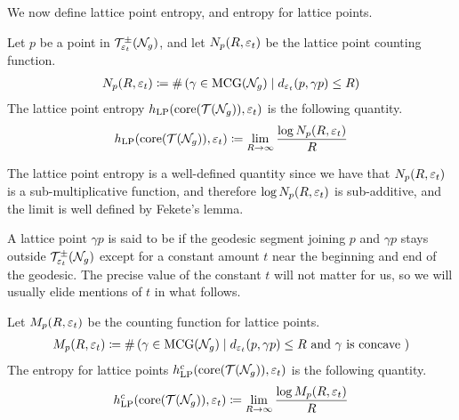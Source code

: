 We now define lattice point entropy, and entropy for \concave lattice points.
\begin{definition}
  Let $p$ be a point in $\mathcal{T}_{\varepsilon_t}^{\pm}(\mathcal{N}_g)$, and let $N_p(R, \varepsilon_t)$ be the lattice point counting function.
  \begin{align*}
    N_p(R, \varepsilon_t) \coloneqq \#\left( \gamma \in \mathrm{MCG}(\mathcal{N}_g) \mid d_{\varepsilon_t}(p, \gamma p) \leq R \right)
  \end{align*}
  The lattice point entropy $h_{\mathrm{LP}}(\mathrm{core}(\mathcal{T}(\mathcal{N}_g)), \varepsilon_t)$ is the following quantity.
  \begin{align*}
    h_{\mathrm{LP}}(\mathrm{core}(\mathcal{T}(\mathcal{N}_g)), \varepsilon_t) \coloneqq \lim_{R \to \infty} \frac{\log N_p(R, \varepsilon_t)}{R}
  \end{align*}
\end{definition}

\begin{rem}
  The lattice point entropy is a well-defined quantity since we have that $N_p(R, \varepsilon_t)$ is a sub-multiplicative function, and therefore $\log N_p(R, \varepsilon_t)$ is sub-additive, and the limit is well defined by Fekete's lemma.
\end{rem}

\begin{definition}
  A lattice point $\gamma p$ is said to be \concave if the geodesic segment joining $p$ and $\gamma p$ stays outside $\mathcal{T}_{\varepsilon_t}^{\pm}(\mathcal{N}_g)$ except for a constant amount $t$ near the beginning and end of the geodesic.
  The precise value of the constant $t$ will not matter for us, so we will usually elide mentions of $t$ in what follows.
\end{definition}

\begin{definition}
  Let $M_p(R, \varepsilon_t)$ be the counting function for \concave lattice points.
  \begin{align*}
    M_p(R, \varepsilon_t) \coloneqq \#\left( \gamma \in \mathrm{MCG}(\mathcal{N}_g) \mid \text{$d_{\varepsilon_t}(p, \gamma p) \leq R$ and $\gamma$ is concave }  \right)
  \end{align*}
  The entropy for \concave lattice points $h_{\mathrm{LP}}^c(\mathrm{core}(\mathcal{T}(\mathcal{N}_g)), \varepsilon_t)$ is the following quantity.
  \begin{align*}
    h_{\mathrm{LP}}^c(\mathrm{core}(\mathcal{T}(\mathcal{N}_g)), \varepsilon_t) \coloneqq \lim_{R \to \infty} \frac{\log M_p(R, \varepsilon_t)}{R}
  \end{align*}
\end{definition}

